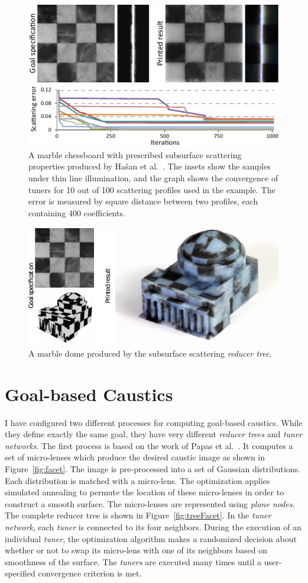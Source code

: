 \begin{figure}[h]
\centering
\includegraphics[width=0.65\linewidth]{figure/fig_chess.pdf}
\caption{
	A marble chessboard with prescribed subsurface scattering properties produced by Ha\v{s}an et al.~.
	The insets show the samples under thin line illumination, and the graph shows the convergence of tuners for 10 out of 100 scattering profiles used in the example. The error is measured by square distance between two profiles, each containing 400 coefficients.}
\label{fig:sub}
\end{figure}

\begin{figure}[h]
\centering
\includegraphics[width=0.75\linewidth]{figure/dome.pdf}
\caption{
	A marble dome produced by the subsurface scattering \emph{reducer tree}.}
\label{fig:dome}
\end{figure}

\section{Goal-based Caustics}
I have configured two different processes for computing goal-based caustics.
While they define exactly the same goal, they have very different \emph{reducer trees} and \emph{tuner networks}.
The first process is based on the work of Papas et al.~.
It computes a set of micro-lenses which produce the desired caustic image as shown in Figure~\ref{fig:facet}.
The image is pre-processed into a set of Gaussian distributions.
Each distribution is matched with a micro-lens.
The optimization applies simulated annealing to permute the location of these micro-lenses
in order to construct a smooth surface.
The micro-lenses are represented using \emph{plane nodes}.
The complete reducer tree is shown in Figure~\ref{fig:treeFacet}.
In the \emph{tuner network}, each \emph{tuner} is connected to its four neighbors.
During the execution of an individual \emph{tuner},
the optimization algorithm makes a randomized decision
about whether or not to swap its micro-lens with one of its neighbors based on smoothness of the surface.
The \emph{tuners} are executed many times until a user-specified convergence criterion is met. 

